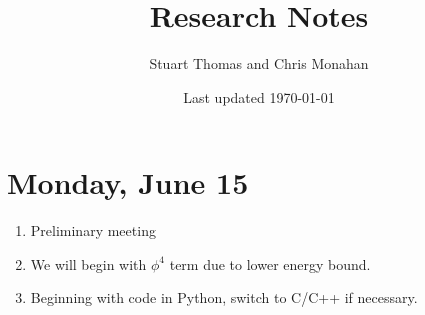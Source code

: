 \documentclass[english]{article}
\begin{document}
\title{Research Notes}
\author{Stuart Thomas and Chris Monahan}
\date{Last updated \today}
\maketitle

\section{Monday, June 15}
\begin{enumerate}
    \item Preliminary meeting
    \item We will begin with $\phi^4$ term due to lower energy bound.
    \item Beginning with code in Python, switch to C/C++ if necessary.
\end{enumerate}
\end{document}
